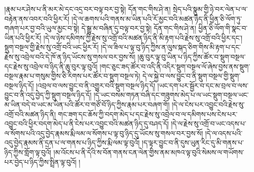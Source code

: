 །རྣམ་པར་ཤེས་པ་ནི་མར་མེ་དང་འདྲ་བར་བལྟ་བར་བྱ་སྟེ། དོན་གང་གིས་ཤེ་ན། སྲེད་པའི་སྣུམ་གྱི་ཉེ་བར་ལེན་པ་ལ་བརྟེན་ནས་འབར་བའི་ཕྱིར་རོ། །དེ་ལ་ཆགས་པའི་གནས་མ་ཡིན་པའི་རོ་མྱང་བའི་མཚན་ཉིད་ནི་ཕྱིན་ཅི་ལོག་ཏུ་གཞག་པར་བྱ་བའི་ཡུལ་མྱང་བ་སྟེ། དེ་སྒྱུ་མ་བཞིན་དུ་བལྟ་བར་བྱ་སྟེ། དོན་གང་གིས་ཤེ་ན། ཕྱིན་ཅི་ལོག་གི་སྣང་བ་ཡིན་པའི་ཕྱིར་རོ། །དེ་ལ་ཉེས་དམིགས་ཀྱི་རྗེས་སུ་འགྲོ་བའི་མཚན་ཉིད་ནི་མི་རྟག་པའི་རྗེས་སུ་འགྲོ་བའི་ཕྱིར་དང་། སྡུག་བསྔལ་གྱི་རྗེས་སུ་འགྲོ་བའི་ཡང་ཕྱིར་རོ། །དེ་ལ་ཟིལ་པ་ལྟ་བུ་ཉིད་ཀྱིས་ན་ལུས་སྐད་ཅིག་གིས་མི་རྟག་པ་དང་རྗེས་སུ་འབྲེལ་བའི་དེ་ཁོ་ན་ཉིད་ཡོངས་སུ་གསལ་བར་བྱས་སོ། །ཆུ་བུར་ལྟ་བུ་ཡིན་པ་ཉིད་ཀྱིས་ཚོར་བ་སྡུག་བསྔལ་དང་རྗེས་སུ་འབྲེལ་བ་ཉིད་ནི་ཆུ་བུར་ལྟ་བུའོ། །གང་ཅུང་ཟད་ཚོར་བ་འདི་ནི་འདིར་སྡུག་བསྔལ་ལོ་ཞེས་བྱས་ནས་སྡུག་བསྔལ་རྣམ་པ་གསུམ་གྱིས་ཅི་རིགས་པར་ཚོར་བ་སྡུག་བསྔལ་ཏེ། དེ་ལ་སྐྱེ་བ་ལས་བྱུང་བ་ནི་སྡུག་བསྔལ་གྱི་སྡུག་བསྔལ་ཉིད་དོ། །འབྲལ་བ་ལས་བྱུང་བ་ནི་འགྱུར་བའི་སྡུག་བསྔལ་ཉིད་དོ། །ཡང་དག་པར་སྦྱོར་བ་དང་མ་བྲལ་བ་ལས་བྱུང་བ་ནི་འདུ་བྱེད་ཀྱི་སྡུག་བསྔལ་ཉིད་དོ། །དེ་ཡང་བསམ་གཏན་བཞི་དང་གཟུགས་མེད་པ་ལ་ཡང་སྡུག་བསྔལ་ཡང་མ་ཡིན་བདེ་བ་ཡང་མ་ཡིན་པའི་ཚོར་བ་གཙོ་བོ་ཉིད་ཀྱིས་རྣམ་པར་བཞག་གོ། །དེ་ལ་ངེས་པར་འབྱུང་བའི་རྗེས་སུ་འགྲོ་བའི་མཚན་ཉིད་ནི། གང་ཟག་དང་ཆོས་ཀྱི་བདག་མེད་པ་དང་རྗེས་སུ་འབྲེལ་བ་ལ་དམིགས་པས་ངེས་པར་འབྱུང་བའི་ཕྱིར་བདག་མེད་པ་ནི་ངེས་པར་འབྱུང་བའི་མཚན་ཉིད་དུ་བཤད་དོ། །དེ་ལ་རྗེས་སུ་འགྲོ་བ་ཡང་འདས་པ་ལ་སོགས་པའི་འདུ་བྱེད་རྣམས་རྨི་ལམ་ལ་སོགས་པ་ལྟ་བུ་ཉིད་དུ་ཡོངས་སུ་གསལ་བར་བྱས་སོ། །དེ་ལ་འདས་པའི་འདུ་བྱེད་རྣམས་ནི་དྲན་པ་ལ་གནས་པ་ཉིད་ཀྱིས་རྨི་ལམ་ལྟ་བུའོ། །ད་ལྟར་བྱུང་བ་ནི་དུས་ཡུན་རིང་དུ་མི་གནས་པ་ཉིད་ཀྱིས་གློག་ལྟ་བུའོ། །མ་འོངས་པ་ནི་དེའི་ས་བོན་གནས་ངན་ལེན་གྱིས་ནམ་མཁའ་ལྟ་བུའི་སེམས་ལ་གཡོགས་པར་བྱེད་པ་ཉིད་ཀྱིས་སྤྲིན་ལྟ་བུའོ། །
